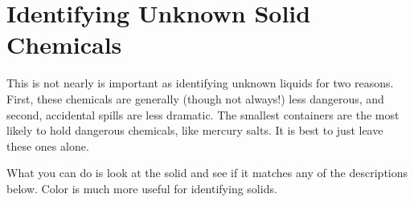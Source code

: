 \section{Identifying Unknown Solid Chemicals}

This is not nearly is important as identifying unknown liquids 
for two reasons. 
First, 
these chemicals are generally (though not always!) less dangerous, 
and second, 
accidental spills are less dramatic. 
The smallest containers are the most likely to hold dangerous chemicals, 
like mercury salts. 
It is best to just leave these ones alone.

What you can do is look at the solid 
and see if it matches any of the descriptions below.
Color is much more useful for identifying solids.

